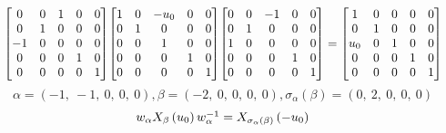 \documentclass[11pt]{article}
\theoremstyle{definition}
\begin{document}
\[
\scaletoalign{\textwidth}{{\left[\begin{matrix}0 & 0 & 1 & 0 & 0\\0 & 1 & 0 & 0 & 0\\-1 & 0 & 0 & 0 & 0\\0 & 0 & 0 & 1 & 0\\0 & 0 & 0 & 0 & 1\end{matrix}\right]} {\left[\begin{matrix}1 & 0 & - u_{0} & 0 & 0\\0 & 1 & 0 & 0 & 0\\0 & 0 & 1 & 0 & 0\\0 & 0 & 0 & 1 & 0\\0 & 0 & 0 & 0 & 1\end{matrix}\right]} {\left[\begin{matrix}0 & 0 & -1 & 0 & 0\\0 & 1 & 0 & 0 & 0\\1 & 0 & 0 & 0 & 0\\0 & 0 & 0 & 1 & 0\\0 & 0 & 0 & 0 & 1\end{matrix}\right]} = {\left[\begin{matrix}1 & 0 & 0 & 0 & 0\\0 & 1 & 0 & 0 & 0\\u_{0} & 0 & 1 & 0 & 0\\0 & 0 & 0 & 1 & 0\\0 & 0 & 0 & 0 & 1\end{matrix}\right]}}
\]
\[
\alpha = \left( -1, \  -1, \  0, \  0, \  0\right), \beta = \left( -2, \  0, \  0, \  0, \  0\right), \sigma_{\alpha}(\beta) = \left( 0, \  2, \  0, \  0, \  0\right)
\]
\[
\scaletoalign{\textwidth}{w_{\alpha} X_{\beta}\left(u_{0}\right) w_{\alpha}^{-1} = X_{\sigma_{\alpha}\left(\beta\right)}\left(- u_{0}\right)}
\]
\end{document}
